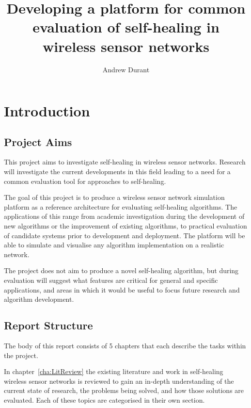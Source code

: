 \documentclass[authoryearcitations]{UoYCSproject}
\author{Andrew Durant}
\title{Developing a platform for common evaluation of self-healing in wireless sensor networks}
\begin{document}
\maketitle
\listoffigures
\listoftables
\renewcommand{\lstlistlistingname}{List of Listings}
\lstlistoflistings

\chapter{Introduction}
\label{cha:Introduction}

\section{Project Aims}

This project aims to investigate self-healing in wireless sensor networks. Research will investigate the current developments in this field leading to a need for a common evaluation tool for approaches to self-healing.

The goal of this project is to produce a wireless sensor network simulation platform as a reference architecture for evaluating self-healing algorithms. The applications of this range from academic investigation during the development of new algorithms or the improvement of existing algorithms, to practical evaluation of candidate systems prior to development and deployment. The platform will be able to simulate and visualise any algorithm implementation on a realistic network.

The project does not aim to produce a novel self-healing algorithm, but during evaluation will suggest what features are critical for general and specific applications, and areas in which it would be useful to focus future research and algorithm development.

\section{Report Structure}

The body of this report consists of 5 chapters that each describe the tasks within the project.

In chapter~\ref{cha:LitReview} the existing literature and work in self-healing wireless sensor networks is reviewed to gain an in-depth understanding of the current state of research, the problems being solved, and how those solutions are evaluated. Each of these topics are categorised in their own section.
\end{document}
